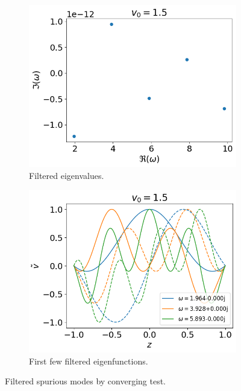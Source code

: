 \begin{figure}[htbp]
	\centering
	\begin{subfigure}[b]{0.5\linewidth}
		\includegraphics[width=\linewidth]{figures/eigvals-good} 
		\caption{Filtered eigenvalues.}
	\end{subfigure}%
	\begin{subfigure}[b]{0.5\linewidth}
		\includegraphics[width=\linewidth]{figures/eigvecs-good} 
		\caption{First few filtered eigenfunctions.}
	\end{subfigure}
	\caption{Filtered spurious modes by converging test.}
	\label{fig:results-good}
\end{figure}

